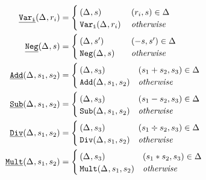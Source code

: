 \newcommand{\wrappedprimspacer}{\mbox{\hspace{1.8cm}} & \\[-3ex]}
\centering
\begin{align*}
\pwrap{\pspawni}(\aStore{},r_{i}) &=
                               \begin{cases}
                                 \wrappedprimspacer
                                 (\aStore{},s) & (r_{i},s) \in \aStore{} \\
                                 \pspawni(\aStore{},r_{i}) & \mathit{otherwise}
                               \end{cases} \\
\pwrap{\pneg}(\aStore{},s) &=
                               \begin{cases}
                                 \wrappedprimspacer
                                 (\aStore{},s') & (-s, s') \in \aStore{} \\
                                 \pneg(\aStore{},s) & \mathit{otherwise}
                               \end{cases} \\
\pwrap{\padd}(\aStore{},s_1,s_2) &=
                                 \begin{cases}
                                   \wrappedprimspacer
                                   (\aStore{},s_3) & (s_1 + s_2, s_3) \in \aStore{} \\
                                   \padd(\aStore{},s_1,s_2) & \mathit{otherwise}
                                 \end{cases} \\
\pwrap{\psub}(\aStore{},s_1,s_2) &=
                                \begin{cases}
                                  \wrappedprimspacer
                                  (\aStore{},s_3) & (s_1 - s_2, s_3) \in \aStore{} \\
                                  \psub(\aStore{},s_1,s_2) & \mathit{otherwise}
                                \end{cases} \\
\pwrap{\pdiv}(\aStore{},s_1,s_2) &=
                                 \begin{cases}
                                   \wrappedprimspacer
                                   (\aStore{},s_3) & (s_1 \div s_2, s_3) \in \aStore{} \\
                                   \pdiv(\aStore{},s_1,s_2) & \mathit{otherwise}
                                 \end{cases} \\
  \pwrap{\pmult}(\aStore{},s_1,s_2) &=
                                     \begin{cases}
                                       \wrappedprimspacer
                                       (\aStore{},s_3) & (s_1 * s_2, s_3) \in \aStore{} \\
                                       \pmult(\aStore{},s_1,s_2) & \mathit{otherwise}
                                     \end{cases}
\end{align*}

